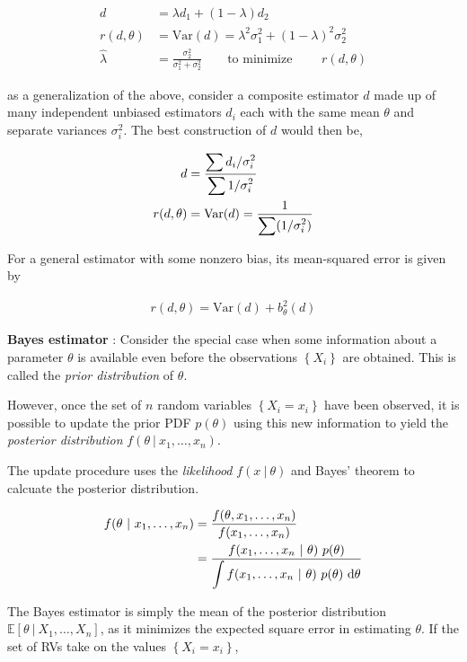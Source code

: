 \begin{align}
	d &= \lambda d_1 + (1-\lambda)d_2 \nonumber \\
	r(d, \theta) &= \mathrm{Var}(d) = \lambda^2 \sigma_1^2 + (1-\lambda)^2 \sigma_2^2 \nonumber \\
	\widehat{\lambda} &= \frac{\sigma_2^2}{\sigma_1^2 + \sigma_2^2} \qquad \text{to minimize } \qquad r(d, \theta)
\end{align}

as a generalization of the above, consider a composite estimator $ d $ made up of many independent unbiased estimators $ d_i $ each with the same mean $ \theta $ and separate variances $ \sigma^2_i $. The best construction of $ d $ would then be,

\begin{align}
	d &= \frac{\displaystyle \sum d_i / \sigma_i^2}{\displaystyle \sum 1/ \sigma_i^2} \\
	r(d, \theta) &= \mathrm{Var}(d) = \frac{\displaystyle 1}{\displaystyle \sum (1/ \sigma_i^2)}
\end{align}

For a general estimator with some nonzero bias, its mean-squared error is given by

\begin{align}
	r(d, \theta) = \mathrm{Var}(d) + b_\theta^2 (d)
\end{align}

\textbf{Bayes estimator} : Consider the special case when some information about a parameter $ \theta $ is available even before the observations $ \left\{X_i\right\} $ are obtained. This is called the \textit{prior distribution} of $ \theta $.

However, once the set of $ n $ random variables $ \left\{X_i = x_i\right\} $ have been observed, it is possible to update the prior PDF $ p(\theta) $ using this new information to yield the \textit{posterior distribution} $ f(\theta\ |\ x_1, \dots, x_n) $.

The update procedure uses the \textit{likelihood} $ f(x\ |\ \theta) $ and Bayes' theorem to calcuate the posterior distribution.

\begin{align}
	f(\theta\ |\ x_1, \dots, x_n) &= \frac{f(\theta, x_1, \dots, x_n)}{f(x_1, \dots, x_n)} \nonumber \\
	&= \frac{\displaystyle f(x_1, \dots, x_n\ |\ \theta)\ p(\theta)}{\displaystyle \int\limits f(x_1, \dots, x_n\ |\ \theta)\ p(\theta)\  \mathrm{d}\theta}
\end{align}

The Bayes estimator is simply the mean of the posterior distribution $ \mathbb{E}[\theta\ |\ X_1, \dots, X_n] $, as it minimizes the expected square error in estimating $ \theta $. If the set of RVs take on the values $ \left\{X_i = x_i\right\} $,


